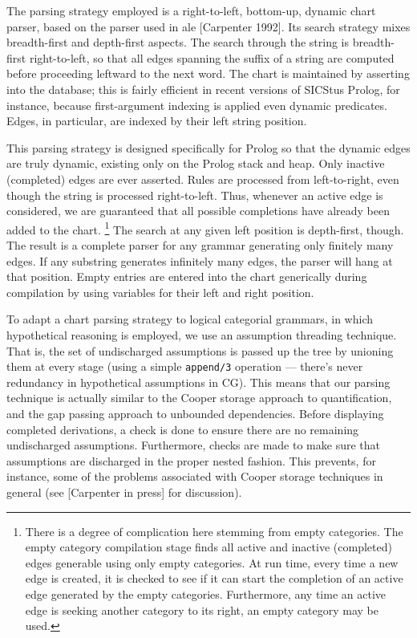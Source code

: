 
The parsing strategy employed is a right-to-left, bottom-up, dynamic
chart parser, based on the parser used in {\sc ale} [Carpenter 1992].
Its search strategy mixes breadth-first and depth-first aspects.  The
search through the string is breadth-first right-to-left, so that all
edges spanning the suffix of a string are computed before proceeding
leftward to the next word.  The chart is maintained by asserting into
the database; this is fairly efficient in recent versions of SICStus
Prolog, for instance, because first-argument indexing is applied even
dynamic predicates.  Edges, in particular, are indexed by their
left string position.

This parsing strategy is designed specifically for Prolog so that the
dynamic edges are truly dynamic, existing only on the Prolog stack and
heap.  Only inactive (completed) edges are ever asserted.  Rules are
processed from left-to-right, even though the string is processed
right-to-left.  Thus, whenever an active edge is considered, we are
guaranteed that all possible completions have already been added to
the chart.%
%
\footnote{There is a degree of complication here stemming from empty
categories.  The empty category compilation stage finds all active and
inactive (completed) edges generable using only empty categories.  At
run time, every time a new edge is created, it is checked to see if it
can start the completion of an active edge generated by the empty
categories.  Furthermore, any time an active edge is seeking another
category to its right, an empty category may be used.}
%
The search at any given left position is depth-first, though.  The
result is a complete parser for any grammar generating only finitely
many edges.  If any substring generates infinitely many edges, the
parser will hang at that position.  Empty entries are entered into the
chart generically during compilation by using variables for their
left and right position.

To adapt a chart parsing strategy to logical categorial grammars, in
which hypothetical reasoning is employed, we use an assumption
threading technique.  That is, the set of undischarged assumptions is
passed up the tree by unioning them at every stage (using a simple
{\tt append/3} operation --- there's never redundancy in hypothetical
assumptions in CG).  This means that our parsing technique is actually
similar to the Cooper storage approach to quantification, and the gap
passing approach to unbounded dependencies.  Before displaying
completed derivations, a check is done to ensure there are no
remaining undischarged assumptions.  Furthermore, checks are made to
make sure that assumptions are discharged in the proper nested
fashion.  This prevents, for instance, some of the problems associated
with Cooper storage techniques in general (see [Carpenter in press]
for discussion).

